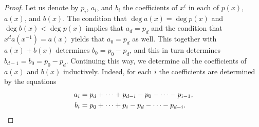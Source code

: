 \documentclass[11pt, a4paper, english]{amsart}
\theoremstyle{teoremas}
\theoremstyle{definition}
\begin{document}
\begin{proof}
    Let us denote by $p_i$, $a_i$, and $b_i$ the coefficients of $x^i$ in each of $p(x)$, $a(x)$, and $b(x)$. The condition that $\deg a(x) = \deg p(x)$ and $\deg b(x) < \deg p(x)$ implies that $a_d = p_d$ and the condition that $x^d a(x^{-1}) = a(x)$ yields that $a_0 = p_d$ as well. This together with $a(x)+b(x)$ determines $b_0 = p_0 - p_d$, and this in turn determines $b_{d-1}=b_0=p_0-p_d$. Continuing this way, we determine all the coefficients of $a(x)$ and $b(x)$ inductively. Indeed, for each $i$ the coefficients are determined by the equations
    \begin{align*}
        a_i &= p_d + \cdots + p_{d-i} - p_0 - \cdots - p_{i-1},\\
        b_i &= p_0 + \cdots + p_i - p_d - \cdots - p_{d-i}.\qedhere
    \end{align*}
\end{proof}
\end{document}
